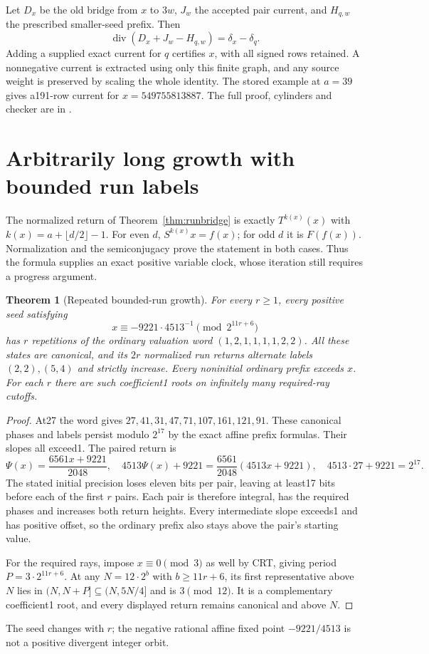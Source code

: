 \documentclass[11pt]{article}
\newtheorem{theorem}{Theorem}
\begin{document}
Let $D_x$ be the old bridge from $x$ to $3w$, $J_w$ the accepted pair
current, and $H_{q,w}$ the prescribed smaller-seed prefix. Then
\[
\operatorname{div}(D_x+J_w-H_{q,w})=\delta_x-\delta_q.
\]
Adding a supplied exact current for $q$ certifies $x$, with all signed
rows retained. A nonnegative current is extracted using only this finite
graph, and any source weight is preserved by scaling the whole identity.
The stored example at $a=39$ gives a191-row current for
$x=549755813887$. The full proof, cylinders and checker are in
.

\section{Arbitrarily long growth with bounded run labels}
The normalized return of Theorem~\ref{thm:runbridge} is exactly
$T^{k(x)}(x)$ with $k(x)=a+\lfloor d/2\rfloor-1$.
For even $d$, $S^{k(x)}x=f(x)$; for odd $d$ it is $F(f(x))$.
Normalization and the semiconjugacy prove the statement in both cases.
Thus the formula supplies an exact positive variable clock, whose
iteration still requires a progress argument.

\begin{theorem}[Repeated bounded-run growth]\label{thm:boundedruns}
For every $r\ge1$, every positive seed satisfying
\[
x\equiv-9221\cdot4513^{-1}\pmod{2^{11r+6}}
\]
has $r$ repetitions of the ordinary valuation word
$(1,2,1,1,1,1,2,2)$. All these states are canonical, and its $2r$
normalized run returns alternate labels $(2,2),(5,4)$ and strictly
increase. Every noninitial ordinary prefix exceeds $x$.
For each $r$ there are such coefficient1 roots on infinitely many
required-ray cutoffs.
\end{theorem}
\begin{proof}
At27 the word gives
$27,41,31,47,71,107,161,121,91$. These canonical phases and labels
persist modulo $2^{17}$ by the exact affine prefix formulas.
Their slopes all exceed1. The paired return is
\[
\Psi(x)=\frac{6561x+9221}{2048},\quad
4513\Psi(x)+9221=\frac{6561}{2048}(4513x+9221),\quad
4513\cdot27+9221=2^{17}.
\]
The stated initial precision loses eleven bits per pair, leaving at
least17 bits before each of the first $r$ pairs. Each pair is therefore
integral, has the required phases and increases both return heights.
Every intermediate slope exceeds1 and has positive offset, so the
ordinary prefix also stays above the pair's starting value.

For the required rays, impose $x\equiv0\pmod3$ as well by CRT,
giving period $P=3\cdot2^{11r+6}$. At any $N=12\cdot2^b$ with
$b\ge11r+6$, its first representative above $N$ lies in
$(N,N+P]\subseteq(N,5N/4]$ and is $3\pmod{12}$.
It is a complementary coefficient1 root, and every displayed return
remains canonical and above $N$.
\end{proof}
The seed changes with $r$; the negative rational affine fixed point
$-9221/4513$ is not a positive divergent integer orbit.
\end{document}
